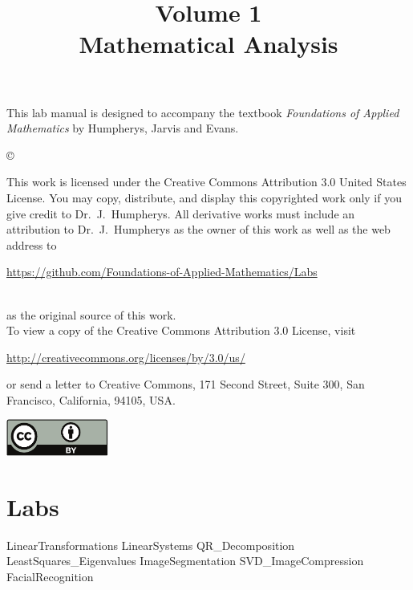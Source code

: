 \documentclass[opener-c,labs,blue,nociteref]{HJnewsiambook}
\title{Volume 1\\ Mathematical Analysis}
\begin{document}

\thispagestyle{empty} %
\maketitle
\thispagestyle{empty}
\frontmatter



\begin{thepreface} %

This lab manual is designed to accompany the textbook \emph{Foundations of Applied Mathematics} by Humpherys, Jarvis and Evans.

\vfill
\copyright{This work is licensed under the Creative Commons Attribution 3.0 United States
License.  You may copy, distribute, and display this copyrighted work only if you give
credit to Dr.~J.~Humpherys. All derivative works must include an attribution to Dr.~J.~Humpherys as the owner of this work as well as the web address to
\\\centerline{\url{https://github.com/Foundations-of-Applied-Mathematics/Labs}}\\as the original source of this work.
\\To view a copy of the Creative Commons Attribution 3.0 License, visit
\\\centerline{\url{http://creativecommons.org/licenses/by/3.0/us/}} or send a letter to Creative Commons, 171 Second Street, Suite 300, San Francisco, California, 94105, USA.}

\vfill
\centering\includegraphics[height=1.2cm]{by.pdf}
\vfill
\end{thepreface}

\setcounter{tocdepth}{1}
\tableofcontents

\mainmatter %

\part{Labs} %
{LinearTransformations}
{LinearSystems}
{QR_Decomposition}
{LeastSquares_Eigenvalues}
{ImageSegmentation}
{SVD_ImageCompression}
{FacialRecognition}
\end{document}
